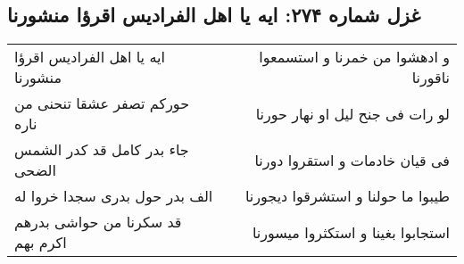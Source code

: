 \begin{center}
\section*{غزل شماره ۲۷۴: ایه یا اهل الفرادیس اقرؤا منشورنا}
\label{sec:0274}
\begin{longtable}{l p{0.5cm} r}
ایه یا اهل الفرادیس اقرؤا منشورنا
&&
و ادهشوا من خمرنا و استسمعوا ناقورنا
\\
حورکم تصفر عشقا تنحنی من ناره
&&
لو رات فی جنح لیل او نهار حورنا
\\
جاء بدر کامل قد کدر الشمس الضحی
&&
فی قیان خادمات و استقروا دورنا
\\
الف بدر حول بدری سجدا خروا له
&&
طیبوا ما حولنا و استشرقوا دیجورنا
\\
قد سکرنا من حواشی بدرهم اکرم بهم
&&
استجابوا بغینا و استکثروا میسورنا
\\
\end{longtable}
\end{center}
